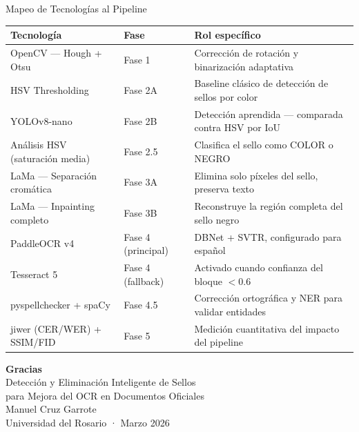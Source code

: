 \documentclass[aspectratio=169, 11pt]{beamer}
\begin{document}
\begin{frame}{Mapeo de Tecnologías al Pipeline}
  \begin{table}
    \centering
    \scriptsize
    \begin{tabular}{@{}p{3.5cm}p{2.5cm}p{6.5cm}@{}}
      \toprule
      \textbf{Tecnología} & \textbf{Fase} & \textbf{Rol específico} \\
      \midrule
      OpenCV — Hough + Otsu           & Fase 1             & Corrección de rotación y binarización adaptativa \\
      HSV Thresholding                & Fase 2A            & Baseline clásico de detección de sellos por color \\
      YOLOv8-nano                     & Fase 2B            & Detección aprendida — comparada contra HSV por IoU \\
      Análisis HSV (saturación media) & Fase 2.5           & Clasifica el sello como COLOR o NEGRO \\
      LaMa — Separación cromática     & Fase 3A            & Elimina solo píxeles del sello, preserva texto \\
      LaMa — Inpainting completo      & Fase 3B            & Reconstruye la región completa del sello negro \\
      PaddleOCR v4                    & Fase 4 (principal) & DBNet + SVTR, configurado para español \\
      Tesseract 5                     & Fase 4 (fallback)  & Activado cuando confianza del bloque $< 0.6$ \\
      pyspellchecker + spaCy          & Fase 4.5           & Corrección ortográfica y NER para validar entidades \\
      jiwer (CER/WER) + SSIM/FID      & Fase 5             & Medición cuantitativa del impacto del pipeline \\
      \bottomrule
    \end{tabular}
  \end{table}
\end{frame}

\begin{frame}[standout]
  \centering
  {\Large\bfseries Gracias}\\[16pt]
  {\normalsize Detección y Eliminación Inteligente de Sellos\\para Mejora del OCR en Documentos Oficiales}\\[20pt]
  {\small Manuel Cruz Garrote}\\
  {\small Universidad del Rosario · Marzo 2026}
\end{frame}
\end{document}
